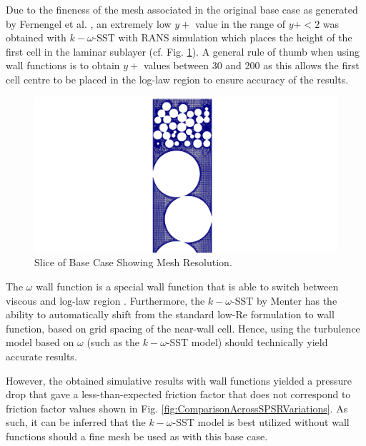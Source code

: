 Due to the fineness of the mesh associated in the original base case as generated by Fernengel et al. \cite{Fernengel2020}, an extremely low $y+$ value in the range of $y+ < 2$ was obtained with $k-\omega$-SST with RANS simulation which places the height of the first cell in the laminar sublayer (cf. Fig. \ref{fig:Slice_MeshFineness_zoomed1_CaseA}). A general rule of thumb when using wall functions is to obtain $y+$ values between 30 and 200 as this allows the first cell centre to be placed in the log-law region to ensure accuracy of the results.

\begin{figure} [h]
	\centering
	\includegraphics[width=0.5\linewidth]{Figures/visualisation/caseA/Slice_MeshFineness_zoomed1_CaseA.png}
	\caption{Slice of Base Case Showing Mesh Resolution.}
	\label{fig:Slice_MeshFineness_zoomed1_CaseA}
\end{figure}
The $\omega$ wall function is a special wall function that is able to switch between viscous and log-law region \cite{Liu2016}. Furthermore, the $k-\omega$-SST by Menter has the ability to automatically shift from the standard low-Re formulation to wall function, based on grid spacing of the near-wall cell. Hence, using the turbulence model based on $\omega$ (such as the $k-\omega$-SST model) should technically yield accurate results.

However, the obtained simulative results with wall functions yielded a pressure drop that gave a less-than-expected friction factor that does not correspond to friction factor values shown in Fig. \ref{fig:ComparisonAcrossSPSRVariations}. As such, it can be inferred that the $k-\omega$-SST model is best utilized without wall functions should a fine mesh be used as with this base case.

